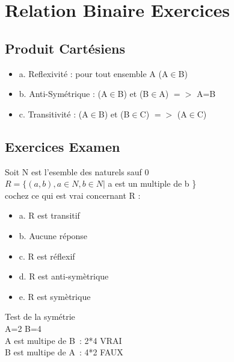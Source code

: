 \newpage

\section{Relation Binaire Exercices}
\vspace{5mm} %

\subsection{Produit Cartésiens}
\vspace{3mm} %

\begin{itemize}
\item {a. Reflexivité : pour tout ensemble A (A$\in$B)}
\item {b. Anti-Symétrique : (A$\in$B) et (B$\in$A) $=>$ A=B}
\item {c. Transitivité : (A$\in$B) et (B$\in$C) $=>$ (A$\in$C)}
\end{itemize}

\subsection{Exercices Examen}
\vspace{3mm} %

Soit N est l’esemble des naturels sauf 0 \\
$R=\{(a,b), a ∈ N, b ∈ N | $ a est un multiple de b \} \\

\vspace{3mm} %
cochez ce qui est vrai concernant R : \\

\begin{itemize}[label=$\square$]
\item {a. R est transitif}
\item {b. Aucune réponse}
\item {c. R est réflexif}
\item {d. R est anti-symètrique}
\item {e. R est symètrique}
\end{itemize}

\vspace{5mm} %

Test de la symétrie \\

A=2 B=4 \\
A est multipe de B : 2*4 VRAI \\
B est multipe de A : 4*2 FAUX \\

